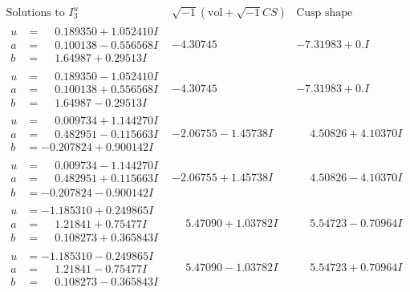 \documentclass[1p]{elsarticle_modified}
\theoremstyle{definition}
\newcommand{\I}{\sqrt{-1}}
\begin{document}
$$\begin{array}{c|c|c}  
\text{Solutions to }I^u_{3}& \I (\text{vol} + \sqrt{-1}CS) & \text{Cusp shape}\\
 \hline 
\begin{aligned}
u &= \phantom{-}0.189350 + 1.052410 I \\
a &= \phantom{-}0.100138 - 0.556568 I \\
b &= \phantom{-}1.64987 + 0.29513 I\end{aligned}
 & -4.30745\phantom{ +0.000000I} & -7.31983 + 0. I\phantom{ +0.000000I} \\ \hline\begin{aligned}
u &= \phantom{-}0.189350 - 1.052410 I \\
a &= \phantom{-}0.100138 + 0.556568 I \\
b &= \phantom{-}1.64987 - 0.29513 I\end{aligned}
 & -4.30745\phantom{ +0.000000I} & -7.31983 + 0. I\phantom{ +0.000000I} \\ \hline\begin{aligned}
u &= \phantom{-}0.009734 + 1.144270 I \\
a &= \phantom{-}0.482951 - 0.115663 I \\
b &= -0.207824 + 0.900142 I\end{aligned}
 & -2.06755 - 1.45738 I & \phantom{-}4.50826 + 4.10370 I \\ \hline\begin{aligned}
u &= \phantom{-}0.009734 - 1.144270 I \\
a &= \phantom{-}0.482951 + 0.115663 I \\
b &= -0.207824 - 0.900142 I\end{aligned}
 & -2.06755 + 1.45738 I & \phantom{-}4.50826 - 4.10370 I \\ \hline\begin{aligned}
u &= -1.185310 + 0.249865 I \\
a &= \phantom{-}1.21841 + 0.75477 I \\
b &= \phantom{-}0.108273 + 0.365843 I\end{aligned}
 & \phantom{-}5.47090 + 1.03782 I & \phantom{-}5.54723 - 0.70964 I \\ \hline\begin{aligned}
u &= -1.185310 - 0.249865 I \\
a &= \phantom{-}1.21841 - 0.75477 I \\
b &= \phantom{-}0.108273 - 0.365843 I\end{aligned}
 & \phantom{-}5.47090 - 1.03782 I & \phantom{-}5.54723 + 0.70964 I \\ \hline\begin{aligned}

\end{aligned}
\end{array}$$
\end{document}
